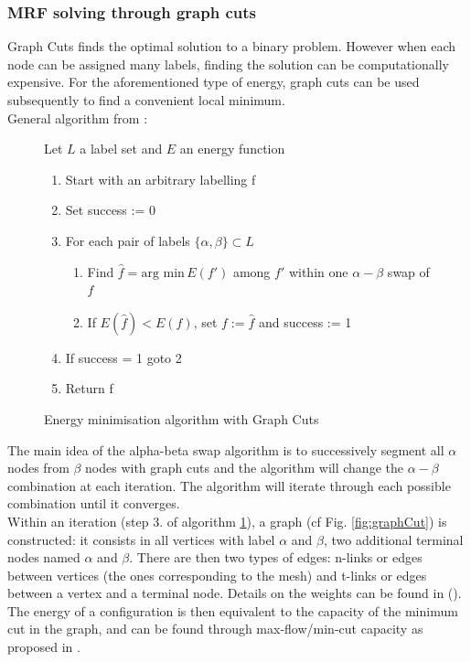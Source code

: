 \documentclass{kththesis}
\begin{document}
\subsubsection{MRF solving through graph cuts}
Graph Cuts finds the optimal solution to a binary problem. However when each node can be assigned many labels, finding the solution can be computationally expensive. For the aforementioned type of energy,  graph cuts can be used subsequently to find a convenient local minimum. \\
General algorithm from \textcite{BoykovEnergyMinim}: 
\begin{figure}[H]
    Let $L$ a label set and $E$ an energy function
    \begin{enumerate}
        \item Start with an arbitrary labelling f
        \item Set success := 0
        \item For each pair of labels $\{\alpha, \beta\}\subset L$
        \begin{enumerate}
            \item Find  $\hat{f} = \text{arg  min} \, E(f')$ among $f'$ within
one $\alpha-\beta$ swap of $f$ 
            \item If $E( \hat{f}) < E(f)$, set $f := \hat{f}$ and success := 1
        \end{enumerate}
        \item If success = 1 goto 2
        \item Return f
    
    \end{enumerate}
    \caption{Energy minimisation algorithm with Graph Cuts}
    \label{fig:minim_energy}
\end{figure}


The main idea of the alpha-beta swap algorithm is to successively segment all $\alpha$ nodes from $\beta$ nodes with graph cuts and the algorithm will change the $\alpha-\beta$ combination at each iteration. The algorithm will iterate through each possible combination until it converges. \\
Within an iteration (step 3. of algorithm \ref{fig:minim_energy}), a graph (cf Fig. \ref{fig:graphCut}) is constructed: it consists in all vertices with label $\alpha$ and $\beta$, two additional terminal nodes named $\alpha$ and $\beta$. There are then two types of edges: n-links or edges between vertices (the ones corresponding to the mesh) and t-links or edges between a vertex and a terminal node. Details on the weights can be found in (\textcite{BoykovEnergyMinim}). \\
The energy of a configuration is then equivalent to the capacity of the minimum cut in the graph, and can be found through max-flow/min-cut capacity as proposed in \textcite{KolmogorovMaxflow}. \\
\end{document}

